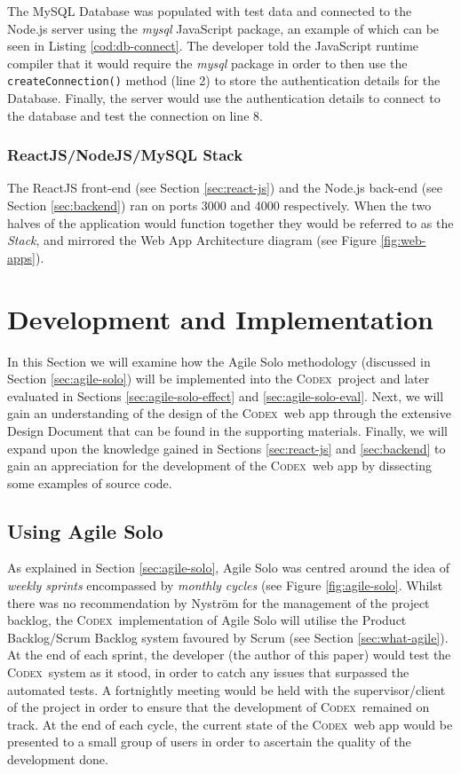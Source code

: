 \documentclass[final]{cmpreport}
\newcommand{\Codex}{\textsc{Codex}}
\begin{document}
			The MySQL Database was populated with test data and connected to the Node.js server using the \emph{mysql} JavaScript package, an example of which can be seen in Listing \ref{cod:db-connect}. The developer told the JavaScript runtime compiler that it would require the \textit{mysql} package in order to then use the \texttt{createConnection()} method (line 2) to store the authentication details for the Database. Finally, the server would use the authentication details to connect to the database and test the connection on line 8.
			
			\subsubsection{ReactJS/NodeJS/MySQL Stack} \label{sec:stack}
			The ReactJS front-end (see Section \ref{sec:react-js}) and the Node.js back-end (see Section \ref{sec:backend}) ran on ports 3000 and 4000 respectively. When the two halves of the application would function together they would be referred to as the \emph{Stack}, and mirrored the Web App Architecture diagram (see Figure \ref{fig:web-apps}). 
			
	\section{Development and Implementation} \label{sec:dev-and-imp}
	In this Section we will examine how the Agile Solo methodology (discussed in Section \ref{sec:agile-solo}) will be implemented into the \Codex \ project and later evaluated in Sections \ref{sec:agile-solo-effect} and \ref{sec:agile-solo-eval}. Next, we will gain an understanding of the design of the \Codex \ web app through the extensive Design Document that can be found in the supporting materials. Finally, we will expand upon the knowledge gained in Sections \ref{sec:react-js} and \ref{sec:backend} to gain an appreciation for the development of the \Codex \ web app by dissecting some examples of source code.
	
		\subsection{Using Agile Solo} \label{sec:use-agile-solo}
		As explained in Section \ref{sec:agile-solo}, Agile Solo was centred around the idea of \textit{weekly sprints} encompassed by \textit{monthly cycles} (see Figure \ref{fig:agile-solo}. Whilst there was no recommendation by Nystr{\"o}m for the management of the project backlog, the \Codex \ implementation of Agile Solo will utilise the Product Backlog/Scrum Backlog system favoured by Scrum (see Section \ref{sec:what-agile}). At the end of each sprint, the developer (the author of this paper) would test the \Codex \ system as it stood, in order to catch any issues that surpassed the automated tests. A fortnightly meeting would be held with the supervisor/client of the project in order to ensure that the development of \Codex \ remained on track. At the end of each cycle, the current state of the \Codex \ web app would be presented to a small group of users in order to ascertain the quality of the development done.
		
\end{document}
